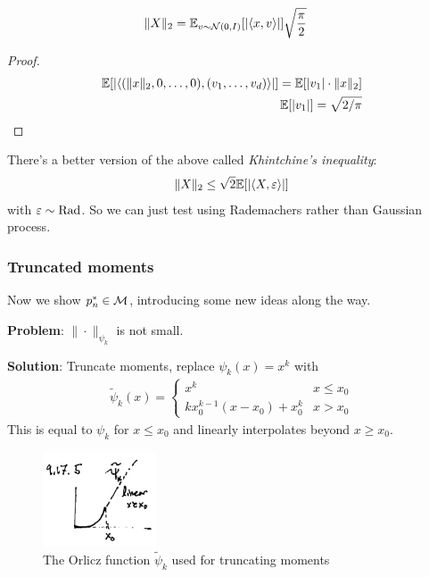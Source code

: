 \begin{lemma}
  \begin{align}
    \|X\|_2 &= \mathbb{E}_{v \sim \mathcal{N}(0,I)}[\lvert\braket{x,v}\rvert] \sqrt{\frac{\pi}{2}}
  \end{align}
\end{lemma}
\begin{proof}
  \begin{align}
    \mathbb{E}[\lvert
    \braket{
      (\|x\|_2, 0, \ldots, 0),
      (v_1,\ldots, v_d)
    } \rvert]
    = \mathbb{E}[\lvert v_1 \rvert \cdot \|x\|_2] \\
    \mathbb{E}[\lvert v_1\rvert] = \sqrt{2/\pi}
  \end{align}
\end{proof}

\begin{remark}
  There's a better version of the above called \emph{Khintchine's inequality}:
  \begin{align}
    \|X\|_2 \leq \sqrt{2} \mathbb{E}[\lvert \braket{X, \varepsilon} \rvert]
  \end{align}
  with $\varepsilon \sim \text{Rad}$. So we can just test using Rademachers rather
  than Gaussian process.
\end{remark}


\subsubsection{Truncated moments}

Now we show $p_n^* \in \mathcal{M}$, introducing some new ideas along the way.

\textbf{Problem}: $\| \cdot \|_{\psi_k}$ is not small.

\textbf{Solution}: Truncate moments, replace $\psi_k(x) = x^k$ with
\begin{align}
  \tilde{\psi}_k(x) = \begin{cases}
    x^k & x \leq x_0 \\
    k x_0^{k-1} (x - x_0) + x_0^k & x > x_0
  \end{cases}
\end{align}
This is equal to $\psi_k$ for $x \leq x_0$ and linearly interpolates beyond $x \geq x_0$.

\begin{figure}[H]
  \begin{center}
    \includegraphics[width=0.3\textwidth]{figures/9-17-5.png}
  \end{center}
  \caption{The Orlicz function $\tilde{\psi}_k$ used for truncating moments}
  \label{fig:tilde-psi-k}
\end{figure}

